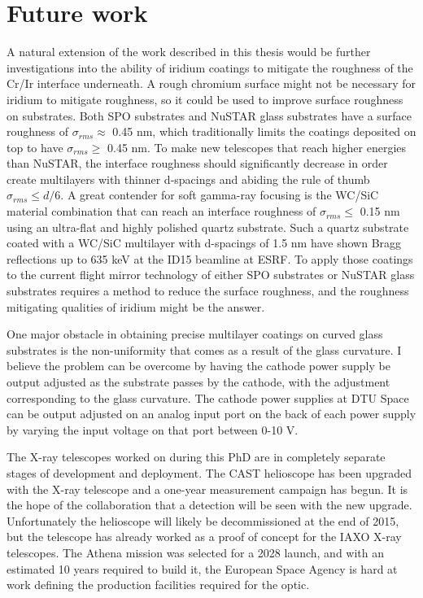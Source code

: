 \section{Future work}
A natural extension of the work described in this thesis would be further investigations into the ability of iridium coatings to mitigate the roughness of the Cr/Ir interface underneath. A rough chromium surface might not be necessary for iridium to mitigate roughness, so it could be used to improve surface roughness on substrates. Both SPO substrates and NuSTAR glass substrates have a surface roughness of $\sigma_{rms}\approx$ 0.45 nm, which traditionally limits the coatings deposited on top to have $\sigma_{rms}\geq$ 0.45 nm. To make new telescopes that reach higher energies than NuSTAR, the interface roughness should significantly decrease in order create multilayers with thinner d-spacings and abiding the rule of thumb $\sigma_{rms} \leq d/6$. A great contender for soft gamma-ray focusing is the WC/SiC material combination that can reach an interface roughness of $\sigma_{rms}\leq$ 0.15 nm using an ultra-flat and highly polished quartz substrate. Such a quartz substrate coated with a WC/SiC multilayer with d-spacings of 1.5 nm have shown Bragg reflections up to 635 keV at the ID15 beamline at ESRF\cite{FernandezPerea:2012fj,FernandezPerea:2013jb}. To apply those coatings to the current flight mirror technology of either SPO substrates or NuSTAR glass substrates requires a method to reduce the surface roughness, and the roughness mitigating qualities of iridium might be the answer.

One major obstacle in obtaining precise multilayer coatings on curved glass substrates is the non-uniformity that comes as a result of the glass curvature. I believe the problem can be overcome by having the cathode power supply be output adjusted as the substrate passes by the cathode, with the adjustment corresponding to the glass curvature. The cathode power supplies at DTU Space can be output adjusted on an analog input port on the back of each power supply by varying the input voltage on that port between 0-10 V.

The X-ray telescopes worked on during this PhD are in completely separate stages of development and deployment. The CAST helioscope has been upgraded with the X-ray telescope and a one-year measurement campaign has begun. It is the hope of the collaboration that a detection will be seen with the new upgrade. Unfortunately the helioscope will likely be decommissioned at the end of 2015, but the telescope has already worked as a proof of concept for the IAXO X-ray telescopes. The Athena mission was selected for a 2028 launch, and with an estimated 10 years required to build it, the European Space Agency is hard at work defining the production facilities required for the optic.

